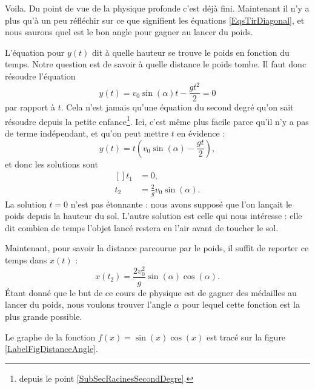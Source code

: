 Voila. Du point de vue de la physique profonde c'est déjà fini. Maintenant il n'y a plus qu'à un peu réfléchir sur ce que signifient les équations \eqref{EqsTirDiagonal}, et nous saurons quel est le bon angle pour gagner au lancer du poids. 

L'équation pour $y(t)$ dit à quelle hauteur se trouve le poids en fonction du temps. Notre question est de savoir à quelle distance le poids tombe. Il faut donc résoudre l'équation
\begin{equation}
	y(t)=v_0\sin(\alpha) t -\frac{ gt^2 }{ 2 }=0
\end{equation}
par rapport à $t$. Cela n'est jamais qu'une équation du second degré qu'on sait résoudre depuis la petite enfance\footnote{depuis le point \ref{SubSecRacinesSecondDegre}.}. Ici, c'est même plus facile parce qu'il n'y a pas de terme indépendant, et qu'on peut mettre $t$ en évidence :
\begin{equation}
	y(t)=t\left( v_0\sin(\alpha)-\frac{ gt }{ 2 } \right),
\end{equation}
et donc les solutions sont
\begin{equation}
	\begin{aligned}[]
		t_1&=0,\\
		t_2&=\frac{ 2 }{ g }v_0\sin(\alpha).
	\end{aligned}
\end{equation}
La solution $t=0$ n'est pas étonnante : nous avons supposé que l'on lançait le poids depuis la hauteur du sol. L'autre solution est celle qui nous intéresse : elle dit combien de temps l'objet lancé restera en l'air avant de toucher le sol.

Maintenant, pour savoir la distance parcourue par le poids, il suffit de reporter ce temps dans $x(t)$ :
\begin{equation}			\label{EqDistancePoinds}
	x(t_2)=\frac{ 2v_0^2 }{ g }\sin(\alpha)\cos(\alpha).
\end{equation}
Étant donné que le but de ce cours de physique est de gagner des médailles au lancer du poids, nous voulons trouver l'angle $\alpha$ pour lequel cette fonction est la plus grande possible.

Le graphe de la fonction $f(x)=\sin(x)\cos(x)$ est tracé sur la figure \ref{LabelFigDistanceAngle}.
\newcommand{\CaptionFigDistanceAngle}{En bleu, la fonction qui nous intéresse : $\sin(x)\cos(x)$. Pour information, en rouge se trouve la fonction $\sin(x)$}


